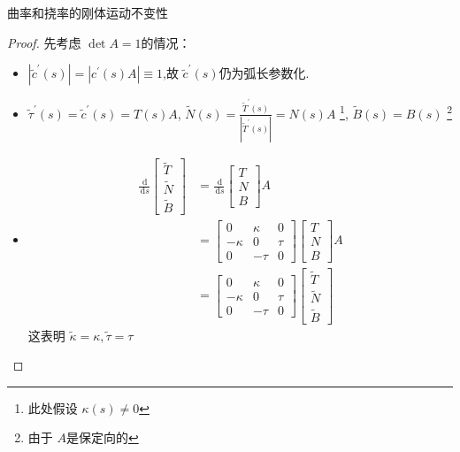 \documentclass[../../古典微分几何.tex]{subfiles}
\begin{document}
\begin{itemize}
\begin{lemma}{曲率和挠率的刚体运动不变性}
    \end{lemma}
\begin{proof}
    先考虑 \(  \det A= 1  \)的情况： 
   \begin{itemize}
    \item   \(  \left| \tilde{c}^{\prime} \left( s \right)  \right|=  \left| c^{\prime} \left( s \right)A  \right|\equiv 1    \),故 \(  \tilde{c}^{\prime} \left( s \right)   \)仍为弧长参数化.
    \item \(  \tilde{\tau} ^{\prime} \left( s \right)=  \tilde{c}^{\prime} \left( s \right)= T\left( s \right)A     \),   \(  \tilde{N}\left( s \right)=  \frac{\tilde{T}^{\prime} \left( s \right)  }{\left| \tilde{T}^{\prime} \left( s \right) \right|   }= N\left( s \right)A     \) \footnote{此处假设 \(   \kappa  \left( s \right)\neq 0   \) }, \(  \tilde{B}\left( s \right)= B\left( s \right)    \) \footnote{由于 \(  A  \)是保定向的 } 
    \item  \[
    \begin{aligned}
    \frac{\,\mathrm{d}  }{\,\mathrm{d} s }\begin{bmatrix} 
         \tilde{T}\\ 
          \tilde{N}\\ 
           \tilde{B} 
    \end{bmatrix} & =  \frac{\,\mathrm{d}  }{\,\mathrm{d} s } \begin{bmatrix} 
        T\\ 
         N\\ 
          B 
    \end{bmatrix}A \\ 
     & =  \begin{bmatrix} 
         0& \kappa  &0\\ 
          - \kappa  &0&\tau \\ 
           0&-\tau &0 
     \end{bmatrix} \begin{bmatrix} 
         T\\ 
          N\\ 
           B 
     \end{bmatrix}A   \\ 
      & = \begin{bmatrix} 
          0& \kappa  &0\\ 
           - \kappa  &0&\tau \\ 
            0&-\tau &0 
      \end{bmatrix}     \begin{bmatrix} 
          \tilde{T}\\ 
           \tilde{N}\\ 
            \tilde{B} 
      \end{bmatrix} 
    \end{aligned}
    \]这表明 \(   \tilde{\kappa}=  \kappa  ,\tilde{\tau} = \tau   \) 
   \end{itemize}
      


\end{proof}
\end{itemize}
\end{document}
